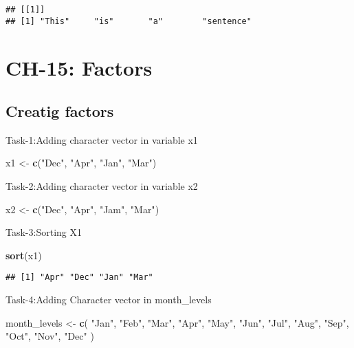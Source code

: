 \documentclass[
]{article}
\newenvironment{Shaded}{\begin{snugshade}}{\end{snugshade}}
\newcommand{\FunctionTok}[1]{\textcolor[rgb]{0.13,0.29,0.53}{\textbf{#1}}}
\newcommand{\NormalTok}[1]{#1}
\newcommand{\OtherTok}[1]{\textcolor[rgb]{0.56,0.35,0.01}{#1}}
\newcommand{\StringTok}[1]{\textcolor[rgb]{0.31,0.60,0.02}{#1}}
\begin{document}
\begin{verbatim}
## [[1]]
## [1] "This"     "is"       "a"        "sentence"
\end{verbatim}

\hypertarget{ch-15-factors}{%
\section{CH-15: Factors}\label{ch-15-factors}}

\hypertarget{creatig-factors}{%
\subsection{Creatig factors}\label{creatig-factors}}

Task-1:Adding character vector in variable x1

\begin{Shaded}
\begin{Highlighting}[]
\NormalTok{x1 }\OtherTok{\textless{}{-}} \FunctionTok{c}\NormalTok{(}\StringTok{"Dec"}\NormalTok{, }\StringTok{"Apr"}\NormalTok{, }\StringTok{"Jan"}\NormalTok{, }\StringTok{"Mar"}\NormalTok{)}
\end{Highlighting}
\end{Shaded}

Task-2:Adding character vector in variable x2

\begin{Shaded}
\begin{Highlighting}[]
\NormalTok{x2 }\OtherTok{\textless{}{-}} \FunctionTok{c}\NormalTok{(}\StringTok{"Dec"}\NormalTok{, }\StringTok{"Apr"}\NormalTok{, }\StringTok{"Jam"}\NormalTok{, }\StringTok{"Mar"}\NormalTok{)}
\end{Highlighting}
\end{Shaded}

Task-3:Sorting X1

\begin{Shaded}
\begin{Highlighting}[]
\FunctionTok{sort}\NormalTok{(x1)}
\end{Highlighting}
\end{Shaded}

\begin{verbatim}
## [1] "Apr" "Dec" "Jan" "Mar"
\end{verbatim}

Task-4:Adding Character vector in month\_levels

\begin{Shaded}
\begin{Highlighting}[]
\NormalTok{month\_levels }\OtherTok{\textless{}{-}} \FunctionTok{c}\NormalTok{(}
  \StringTok{"Jan"}\NormalTok{, }\StringTok{"Feb"}\NormalTok{, }\StringTok{"Mar"}\NormalTok{, }\StringTok{"Apr"}\NormalTok{, }\StringTok{"May"}\NormalTok{, }\StringTok{"Jun"}\NormalTok{, }
  \StringTok{"Jul"}\NormalTok{, }\StringTok{"Aug"}\NormalTok{, }\StringTok{"Sep"}\NormalTok{, }\StringTok{"Oct"}\NormalTok{, }\StringTok{"Nov"}\NormalTok{, }\StringTok{"Dec"}
\NormalTok{)}
\end{Highlighting}
\end{Shaded}
\end{document}
